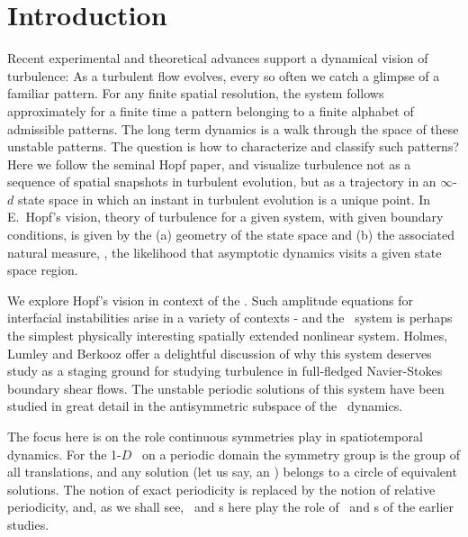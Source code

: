 %

\section{Introduction}

Recent experimental and theoretical advances
support a dynamical vision
of turbulence:
As a turbulent flow evolves,
every so often we catch a glimpse of a familiar pattern.
For any finite  spatial resolution,
the system follows approximately for a finite time 
a pattern belonging to a 
{ finite alphabet}
of admissible patterns.
The long term dynamics is
a {  walk through the space of these unstable patterns}.
The question is how to characterize and classify such patterns?
Here we follow the seminal Hopf paper, and  visualize
turbulence not as  a sequence of 
spatial snapshots in turbulent evolution,
but as a trajectory in an 
 $\infty$-$d$ state space in which an
instant in turbulent evolution is
a { unique} point. In E.~Hopf's vision, 
theory of turbulence for a given system, with given boundary conditions,
is given by the
(a) geometry of the state space and (b) the associated natural measure, 
\ie,
the likelihood that asymptotic dynamics visits a given state space region.

We explore Hopf's vision in context of
the \KSe{}.
Such 
amplitude equations for interfacial instabilities arise in a variety
of contexts - and 
the \KS\ system is perhaps the
simplest physically interesting spatially extended nonlinear system.
Holmes, Lumley
and Berkooz offer a delightful discussion of why this system
deserves study as a staging ground for studying turbulence in 
full-fledged Navier-Stokes boundary shear flows. 
The unstable periodic solutions of
this system have been studied in great detail%
in the antisymmetric subspace of the \KS\ dynamics.

The focus here is on the role continuous symmetries
play in spatiotemporal dynamics. For the 1-$D$ \KS\ on a periodic domain
the symmetry group is the group of all translations, and
any solution (let us say, an \eqv) belongs to a circle of equivalent
solutions. The notion of exact periodicity is 
replaced by the notion of relative periodicity, and,
as we shall see, 
\reqva\ and \rpo s here play the role of \eqva\ and
\po s of the earlier studies. 

